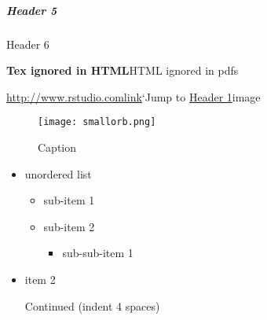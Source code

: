 \documentclass[
]{article}
\providecommand{\tightlist}{%
  \setlength{\itemsep}{0pt}\setlength{\parskip}{0pt}}
\begin{document}
\hypertarget{header-5}{%
\subparagraph{Header 5}\label{header-5}}

Header 6

\textbf{Tex ignored in HTML}HTML ignored in pdfs

\url{http://www.rstudio.com}\href{www.rstudio.com}{link}`Jump to
\protect\hyperlink{anchor}{Header 1}image

\begin{figure}
\centering
\texttt{[image: smallorb.png]}
\caption{Caption}
\end{figure}

\begin{itemize}
\item
  unordered list

  \begin{itemize}
  \item
    sub-item 1
  \item
    sub-item 2

    \begin{itemize}
    \tightlist
    \item
      sub-sub-item 1
    \end{itemize}
  \end{itemize}
\item
  item 2

  Continued (indent 4 spaces)
\end{itemize}
\end{document}
